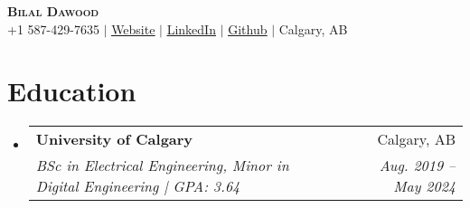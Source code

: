 \documentclass[A4,10pt]{article}
\makeatletter
\newcommand{\resumeSubheading}[4]{
  \vspace{-2pt}\item
    \begin{tabular*}{0.97\textwidth}[t]{l@{\extracolsep{\fill}}r}
      \textbf{#1} & #2 \\
      \textit{\small#3} & \textit{\small #4} \\
    \end{tabular*}\vspace{-7pt}
}
\newcommand{\resumeSubHeadingListStart}{\begin{itemize}[leftmargin=0.15in, label={}]}
\newcommand{\resumeSubHeadingListEnd}{\end{itemize}}
\makeatother
\begin{document}

\begin{center}
    \textbf{\Huge \scshape Bilal Dawood} \\ \vspace{1pt}
    \small +1 587-429-7635 $|$ \href{https://bilaldawood01.github.io}{\underline{Website}} $|$ 
    \href{https://linkedin.com/in/bilal-dawood-2021}{\underline{LinkedIn}} $|$
    \href{https://github.com/BilalDawood01}{\underline{Github}} $|$
\small{Calgary, AB}
\end{center}


\section{Education}
  \resumeSubHeadingListStart
    \resumeSubheading
      {University of Calgary}{Calgary, AB}
      {BSc in Electrical Engineering, Minor in Digital Engineering | GPA: 3.64}{Aug. 2019 -- May 2024}

  \resumeSubHeadingListEnd


  
\end{document}
